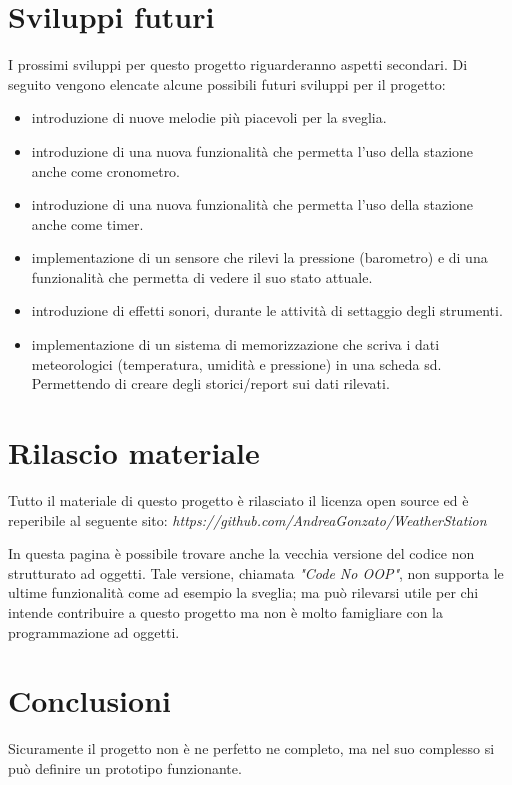 \documentclass[paper=a4, fontsize=10pt]{scrartcl}
\begin{document}
\section{Sviluppi futuri}
I prossimi sviluppi per questo progetto riguarderanno aspetti secondari.
Di seguito vengono elencate alcune possibili futuri sviluppi per il progetto:
\begin{itemize}
\item introduzione di nuove melodie più piacevoli per la sveglia.

\item introduzione di una nuova funzionalità che permetta l'uso della stazione anche come cronometro.

\item introduzione di una nuova funzionalità che permetta l'uso della stazione anche come timer.

\item implementazione di un sensore che rilevi la pressione (barometro) e di una funzionalità che permetta di vedere il suo stato attuale.

\item introduzione di effetti sonori, durante le attività di settaggio degli strumenti.

\item implementazione di un sistema di memorizzazione che scriva i dati meteorologici (temperatura, umidità e pressione) in una scheda sd. Permettendo di creare degli storici/report sui dati rilevati.

\end{itemize}


\section{Rilascio materiale}
Tutto il materiale di questo progetto è rilasciato il licenza open source ed è reperibile al seguente sito:
\textit{https://github.com/AndreaGonzato/WeatherStation}

In questa pagina è possibile trovare anche la vecchia versione del codice non strutturato ad oggetti. Tale versione, chiamata \textit{"Code No OOP"}, non supporta le ultime funzionalità come ad esempio la sveglia; ma può rilevarsi utile per chi intende contribuire a questo progetto ma non è molto famigliare con la programmazione ad oggetti.


\section{Conclusioni}
Sicuramente il progetto non è ne perfetto ne completo, ma nel suo complesso si può definire un prototipo funzionante.
\end{document}
